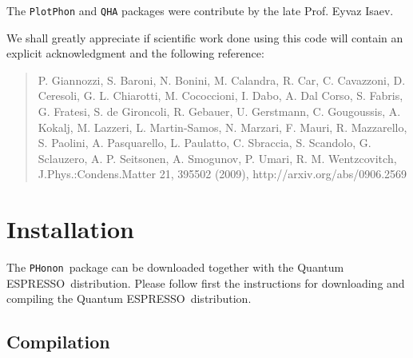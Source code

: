 \documentclass[12pt,a4paper]{article}
\def\qe{{\sc Quantum ESPRESSO}}
\def\PHonon{\texttt{PHonon}}
\begin{document}
The \texttt{PlotPhon} and \texttt{QHA} packages were contribute by the
late Prof. Eyvaz Isaev.

We shall greatly appreciate if scientific work done using this code will 
contain an explicit acknowledgment and the following reference:
\begin{quote}
P. Giannozzi, S. Baroni, N. Bonini, M. Calandra, R. Car, C. Cavazzoni,
D. Ceresoli, G. L. Chiarotti, M. Cococcioni, I. Dabo, A. Dal Corso,
S. Fabris, G. Fratesi, S. de Gironcoli, R. Gebauer, U. Gerstmann,
C. Gougoussis, A. Kokalj, M. Lazzeri, L. Martin-Samos, N. Marzari,
F. Mauri, R. Mazzarello, S. Paolini, A. Pasquarello, L. Paulatto,
C. Sbraccia, S. Scandolo, G. Sclauzero, A. P. Seitsonen, A. Smogunov,
P. Umari, R. M. Wentzcovitch, J.Phys.:Condens.Matter 21, 395502 (2009),
http://arxiv.org/abs/0906.2569
\end{quote}

\section{Installation}

The \PHonon\ package can be downloaded together with the \qe\ distribution. Please follow first
the instructions for downloading and compiling the \qe\ distribution.

\subsection{Compilation}
\end{document}
